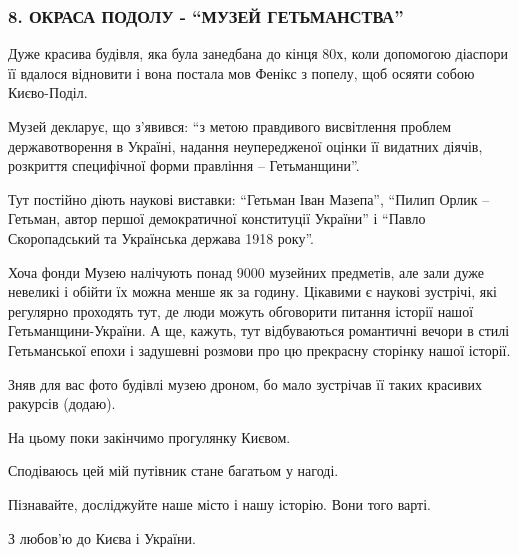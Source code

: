  
 
 
 
 
\subsubsection{8. ОКРАСА ПОДОЛУ - \enquote{МУЗЕЙ ГЕТЬМАНСТВА}}

Дуже красива будівля, яка була занедбана до кінця 80х, коли допомогою діаспори
її вдалося відновити і вона постала мов Фенікс з попелу, щоб осяяти собою
Києво-Поділ.

Музей декларує, що з’явився: \enquote{з метою правдивого висвітлення проблем
державотворення в Україні, надання неупередженої оцінки її видатних діячів,
розкриття специфічної форми правління – Гетьманщини}.

Тут постійно діють наукові виставки: \enquote{Гетьман Іван Мазепа},
\enquote{Пилип Орлик – Гетьман, автор першої демократичної конституції України}
і \enquote{Павло Скоропадський та Українська держава 1918 року}. 

Хоча фонди Музею налічують понад 9000 музейних предметів, але зали дуже
невеликі і обійти їх можна менше як за годину. Цікавими є наукові зустрічі, які
регулярно проходять тут, де люди можуть обговорити питання історії нашої
Гетьманщини-України. А ще, кажуть, тут відбуваються романтичні вечори в стилі
Гетьманської епохи і задушевні розмови про цю прекрасну сторінку нашої історії.

Зняв для вас фото будівлі музею дроном, бо мало зустрічав її таких красивих
ракурсів (додаю). 

На цьому поки закінчимо прогулянку Києвом.

Сподіваюсь цей мій путівник стане багатьом у нагоді.

Пізнавайте, досліджуйте наше місто і нашу історію. Вони того варті.

З любов'ю до Києва і України.

